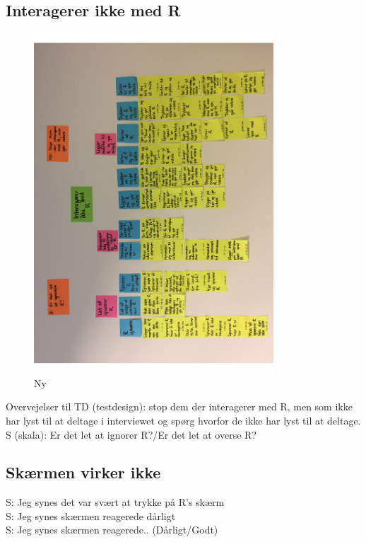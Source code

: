 \subsection{Interagerer ikke med R}
%
%
\begin{figure}[H]
\centering
\includegraphics[width = 0.8\textwidth, angle = -90]{Figure/AffinityDiagram/InteragererIkkeMedR} 
\caption{Ny}
\label{fig:AFInteragererIkkeMedR}
\end{figure}
\noindent
%
Overvejelser til TD (testdesign): stop dem der interagerer med R, men som ikke har lyst til at deltage i interviewet og spørg hvorfor de ikke har lyst til at deltage. \\
S (skala): Er det let at ignorer R?/Er det let at overse R?

\subsection{Skærmen virker ikke}
%
S: Jeg synes det var svært at trykke på R's skærm\\
S: Jeg synes skærmen reagerede dårligt\\
S: Jeg synes skærmen reagerede.. (Dårligt/Godt)\\

